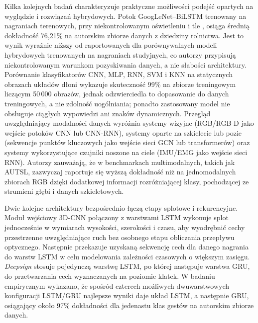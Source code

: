 Kilka kolejnych badań charakteryzuje praktyczne możliwości podejść opartych
na wyglądzie i rozwiązań hybrydowych. Potok GoogLeNet--BiLSTM trenowany na
nagraniach terenowych, przy niekontrolowanym oświetleniu i tle
\cite{agri2021bilstm}, osiąga średnią dokładność 76,21\% na autorskim zbiorze danych
z dziedziny rolnictwa. Jest to wynik wyraźnie niższy od raportowanych dla
porównywalnych modeli hybrydowych trenowanych na nagraniach studyjnych, co autorzy
przypisują niekontrolowanym warunkom pozyskiwania danych, a nie słabości
architektury. Porównanie klasyfikatorów CNN, MLP, RNN, SVM i KNN na statycznych
obrazach układów dłoni \cite{ann2022recognition} wykazuje skuteczność 99\%
na zbiorze treningowym liczącym 50\,000 obrazów, jednak odzwierciedla to dopasowanie
do danych treningowych, a nie zdolność uogólniania; ponadto zastosowany model
nie obsługuje ciągłych wypowiedzi ani znaków dynamicznych. Przegląd uwzględniający
modalności danych \cite{modalities2022review} wyróżnia systemy wizyjne (RGB/RGB-D
jako wejście potoków CNN lub CNN-RNN), systemy oparte na szkielecie lub pozie
(sekwencje punktów kluczowych jako wejście sieci GCN lub transformerów) oraz
systemy wykorzystujące czujniki noszone na ciele (IMU/EMG jako wejście sieci RNN).
Autorzy zauważają, że w benchmarkach multimodalnych, takich jak AUTSL, zazwyczaj
raportuje się wyższą dokładność niż na jednomodalnych zbiorach RGB dzięki
dodatkowej informacji rozróżniającej klasy, pochodzącej ze strumieni głębi
 i danych szkieletowych.

Dwie kolejne architektury bezpośrednio łączą etapy splotowe i rekurencyjne.
Moduł wejściowy 3D-CNN połączony z warstwami LSTM \cite{cnn3dlstm2023realtime}
wykonuje splot jednocześnie w wymiarach wysokości, szerokości i czasu, aby
wyodrębnić cechy przestrzenne uwzględniające ruch bez osobnego etapu obliczania
przepływu optycznego. Następnie przekazuje uzyskaną sekwencję cech dla danego
nagrania do warstw LSTM w celu modelowania zależności czasowych o większym zasięgu.
\emph{Deepsign} \cite{deepsign2022} stosuje pojedynczą warstwę LSTM, po której
następuje warstwa GRU, do przetwarzania cech wyznaczanych na poziomie klatek.
W badaniu empirycznym wykazano, że spośród czterech możliwych dwuwarstwowych
konfiguracji LSTM/GRU najlepsze wyniki daje układ LSTM, a następnie GRU, osiągający
około 97\% dokładności dla jedenastu klas gestów na autorskim zbiorze danych.

